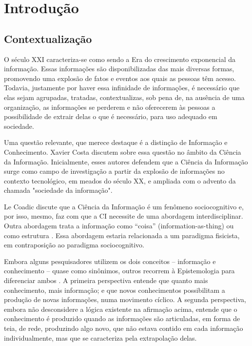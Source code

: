 \chapter{Introdução}\label{intro}

\section{Contextualização}\label{intro:problem}

O século XXI caracteriza-se como sendo a Era do crescimento exponencial da informação. Essas informações são disponibilizadas das mais diversas formas, promovendo uma explosão de fatos e eventos aos quais as pessoas têm acesso. Todavia, justamente por haver essa infinidade de informações, é necessário que elas sejam agrupadas, tratadas, contextualizas, sob pena de, na ausência de uma organização, as informações se perderem e não oferecerem às pessoas a possibilidade de extrair delas o que é necessário, para uso adequado em sociedade.

Uma questão relevante, que merece destaque é a distinção de Informação e Conhecimento. Xavier Costa \cite{xavier2011relaccoes} discutem sobre essa questão no âmbito da Ciência da Informação. Inicialmente, esses autores defendem que a Ciência da Informação surge como campo de investigação a partir da explosão de informações no contexto tecnológico, em meados do século XX, e ampliada com o advento da chamada "sociedade da informação".

Le Coadic \cite{da1996coadic} discute que a Ciência da Informação é um fenômeno sociocognitivo e, por isso, mesmo, faz com que a CI necessite de uma abordagem interdisciplinar. Outra abordagem trata a informação como ``coisa'' (information-as-thing) ou como estrutura \cite{xavier2011relaccoes}. Essa abordagem estaria relacionada a um paradigma fisicista, em contraposição ao paradigma sociocognitivo. 

Embora alguns pesquisadores utilizem os dois conceitos -- informação e conhecimento -- quase como sinônimos, outros recorrem à Epistemologia para diferenciar ambos \cite{xavier2011relaccoes}. A primeira perspectiva entende que quanto mais conhecimento, mais informação; e que novos conhecimentos possibilitam a produção de novas informações, numa movimento cíclico. A segunda perspectiva, embora não desconsidere a lógica existente na afirmação acima, entende que o conhecimento é produzido quando as informações são articuladas, em forma de teia, de rede, produzindo algo novo, que não estava contido em cada informação individualmente, mas que se caracteriza pela extrapolação delas.

